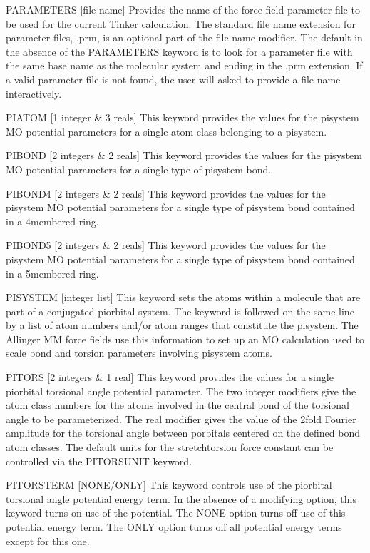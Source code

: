 \documentclass[letterpaper,11pt,english]{sphinxmanual}
\begin{document}
PARAMETERS {[}file name{]}     Provides the name of the force field parameter file to be used for the current Tinker calculation. The standard file name extension for parameter files, .prm, is an optional part of the file name modifier. The default in the absence of the PARAMETERS keyword is to look for a parameter file with the same base name as the molecular system and ending in the .prm extension. If a valid parameter file is not found, the user will asked to provide a file name interactively.

PIATOM {[}1 integer \& 3 reals{]}     This keyword provides the values for the pisystem MO potential parameters for a single atom class belonging to a pisystem.

PIBOND {[}2 integers \& 2 reals{]}     This keyword provides the values for the pisystem MO potential parameters for a single type of pisystem bond.

PIBOND4 {[}2 integers \& 2 reals{]}     This keyword provides the values for the pisystem MO potential parameters for a single type of pisystem bond contained in a 4\sphinxhyphen{}membered ring.

PIBOND5 {[}2 integers \& 2 reals{]}     This keyword provides the values for the pisystem MO potential parameters for a single type of pisystem bond contained in a 5\sphinxhyphen{}membered ring.

PISYSTEM {[}integer list{]}     This keyword sets the atoms within a molecule that are part of a conjugated pi\sphinxhyphen{}orbital system. The keyword is followed on the same line by a list of atom numbers and/or atom ranges that constitute the pi\sphinxhyphen{}system. The Allinger MM force fields use this information to set up an MO calculation used to scale bond and torsion parameters involving pi\sphinxhyphen{}system atoms.

PITORS {[}2 integers \& 1 real{]}     This keyword provides the values for a single pi\sphinxhyphen{}orbital torsional angle potential parameter. The two integer modifiers give the atom class numbers for the atoms involved in the central bond of the torsional angle to be parameterized. The real modifier gives the value of the 2\sphinxhyphen{}fold Fourier amplitude for the torsional angle between p\sphinxhyphen{}orbitals centered on the defined bond atom classes. The default units for the stretch\sphinxhyphen{}torsion force constant can be controlled via the PITORSUNIT keyword.

PITORSTERM {[}NONE/ONLY{]}     This keyword controls use of the pi\sphinxhyphen{}orbital torsional angle potential energy term. In the absence of a modifying option, this keyword turns on use of the potential. The NONE option turns off use of this potential energy term. The ONLY option turns off all potential energy terms except for this one.
\end{document}
